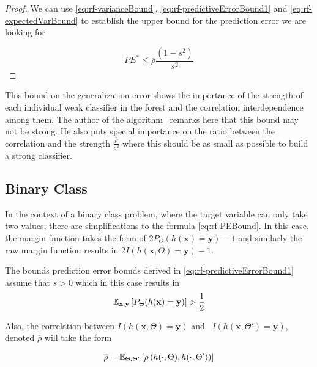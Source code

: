 \begin{proof}
	We can use \cref{eq:rf-varianceBound}, \cref{eq:rf-predictiveErrorBound1} and \cref{eq:rf-expectedVarBound} to establish the upper bound for the prediction error we are looking for

            \begin{equation}\label{eq:rf-PEBound}
            PE^* \leq \overline{\rho}\frac{(1-s^2)}{s^2}
            \end{equation}

\end{proof}


This bound on the generalization error shows the importance of the strength of each individual weak classifier in the forest and the correlation interdependence among them. The author of the algorithm~\textcite{breiman-randomforests} remarks here that this bound may not be strong. He also puts special importance on the ratio between the correlation and the strength $\frac{\overline{\rho}}{s^2}$ where this should be as small as possible to build a strong classifier.


\subsection{Binary Class}
In the context of a binary class problem, where the target variable can only take two values, there are simplifications to the formula \cref{eq:rf-PEBound}. In this case, the margin function takes the form of $2 P_{\Theta}(h(\textbf{x}) = \textbf{y}) -1$ and similarly the raw margin function results in $2 I(h(\textbf{x}, \Theta) = \textbf{y}) -1$.


The bounds prediction error bounds derived in \cref{eq:rf-predictiveErrorBound1} assume that $s >0$ which in this case results in
\begin{equation}
\operatorname{\mathbb{E}}_{\textbf{x},\textbf{y}} \left[ P_{\Theta}(h(\textbf{x}) = \textbf{y}) \right] > \frac{1}{2}
\end{equation}


Also, the correlation between $I(h(\textbf{x}, \Theta) = \textbf{y})$ and \ $I(h(\textbf{x}, \Theta') = \textbf{y})$, denoted $\overline{\rho}$ will take the form

\begin{equation}
 \overline{\rho} = \operatorname{\mathbb{E}}_{\Theta,\Theta'} \left[ \rho \left( h(\cdot{},\Theta) ,h(\cdot{},\Theta') \right)  \right]
 \end{equation}



